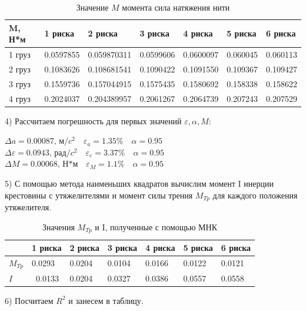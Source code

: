 \documentclass[14pt]{extreport}
\begin{document}
\begin{table}[!ht]
    \centering
    \begin{tabular}{|l|l|l|l|l|l|l|}
    \hline
        M, Н*м & 1 риска & 2 риска & 3 риска & 4 риска & 5 риска & 6 риска  \\ \hline
        1 груз & 0.0597855 & 0.059870311 & 0.0599606 & 0.0600097 & 0.060045 & 0.060113  \\ \hline
        2 груз & 0.1083626 & 0.108681541 & 0.1090422 & 0.1091550 & 0.109367 & 0.109427 \\ \hline
        3 груз & 0.1559736 & 0.157044915 & 0.1575435 & 0.1580692 & 0.158338& 0.158622 \\ \hline
        4 груз & 0.2024037 & 0.204389957 & 0.2061267 & 0.2064739 & 0.207243 & 0.207529 \\ \hline
    \end{tabular}
    \caption{Значение $M$ момента сила натяжения нити}
\end{table}

4) Рассчитаем погрешность для первых значений $\varepsilon, \alpha, M$:
\begin{center}
    $\Delta a = 0.00087\text{, м/}c^2\quad \varepsilon_{a} = 1.35\%\quad \alpha = 0.95$\\
    $\Delta \varepsilon = 0.0943\text{, рад/}c^2\quad \varepsilon_{\varepsilon} = 3.37\%\quad \alpha = 0.95$\\
    $\Delta M = 0.00068\text{, Н*м}\quad \varepsilon_{M} = 1.1\%\quad \alpha = 0.95$\\
\end{center}

5) С помощью метода наименьших квадратов вычислим момент I инерции крестовины с утяжелителями и момент силы трения $M_{Tp}$ для каждого положения утяжелителя.
\newpage
\begin{table}[!ht]
    \centering
    \begin{tabular}{|l|l|l|l|l|l|l|}
    \hline
        ~ & 1 риска & 2 риска & 3 риска & 4 риска & 5 риска & 6 риска  \\ \hline
        $M_{Tp}$ & 0.0293 &0.0204 &0.0104 &0.0166 &0.0122 &0.0121\\ \hline
        $I$ & ~0.0133 &0.0204 &0.0327 &0.0386 &0.0557 &0.0558 \\ \hline
    \end{tabular}
    \caption{Значения $M_{Tp}$ и I, полученные с помощью МНК}
\end{table}

6) Посчитаем $R^2$ и занесем в таблицу.
\end{document}

